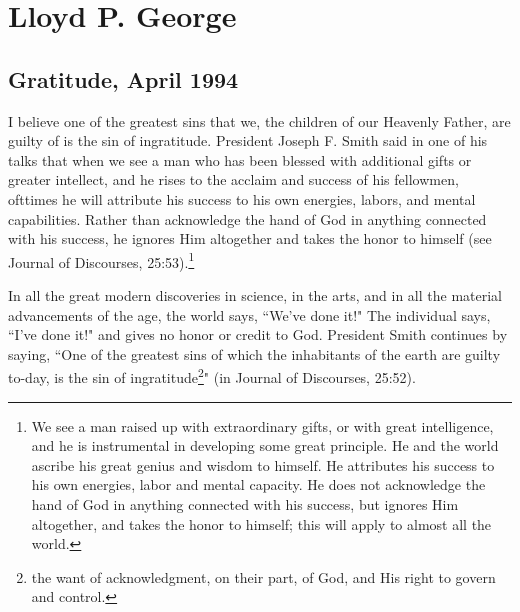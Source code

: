 \section{Lloyd P. George}

\subsection{Gratitude, April 1994}

I believe one of the greatest sins that we, the children of our Heavenly Father, are guilty of is the sin of ingratitude. President Joseph F. Smith said in one of his talks that when we see a man who has been blessed with additional gifts or greater intellect, and he rises to the acclaim and success of his fellowmen, ofttimes he will attribute his success to his own energies, labors, and mental capabilities. Rather than acknowledge the hand of God in anything connected with his success, he ignores Him altogether and takes the honor to himself (see Journal of Discourses, 25:53).\footnote{We see a man raised up with extraordinary gifts, or with great intelligence, and he is instrumental in developing some great principle. He and the world ascribe his great genius and wisdom to himself. He attributes his success to his own energies, labor and mental capacity. He does not acknowledge the hand of God in anything connected with his success, but ignores Him altogether, and takes the honor to himself; this will apply to almost all the world.}

In all the great modern discoveries in science, in the arts, and in all the material advancements of the age, the world says, ``We've done it!" The individual says, ``I've done it!" and gives no honor or credit to God. President Smith continues by saying, ``One of the greatest sins of which the inhabitants of the earth are guilty to-day, is the sin of ingratitude\footnote{the want of acknowledgment, on their part, of God, and His right to govern and control.}" (in Journal of Discourses, 25:52).